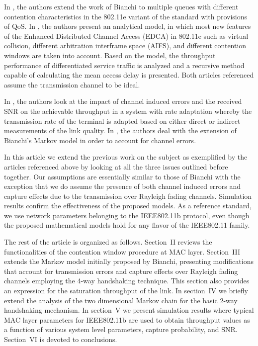 \documentclass[10pt,onecolumn,a4paper]{IEEEtran}
\begin{document}
In \cite{Randhawa}, the authors extend the work of Bianchi to
multiple queues with different contention characteristics in the
802.11e variant of the standard with provisions of QoS. In
\cite{kong}, the authors present an analytical model, in which
most new features of the Enhanced Distributed Channel Access
(EDCA) in 802.11e such as virtual collision, different arbitration
interframe space (AIFS), and different contention windows are taken
into account. Based on the model, the throughput performance of
differentiated service traffic is analyzed and a recursive method
capable of calculating the mean access delay is presented. Both
articles referenced assume the transmission channel to be ideal.

In \cite{Qiao}, the authors look at the impact of channel induced
errors and the received SNR on the achievable throughput in a
system with rate adaptation whereby the transmission rate of the
terminal is adapted based on either direct or indirect
measurements of the link quality. In \cite{Chatzimisios}, the
authors deal with the extension of Bianchi's Markov model in order
to account for channel errors.

In this article we extend the previous work on the subject as
exemplified by the articles referenced above by looking at all the
three issues outlined before together. Our assumptions are
essentially similar to those of Bianchi \cite{Bianchi} with the
exception that we do assume the presence of both channel induced
errors and capture effects due to the transmission over Rayleigh
fading channels. Simulation results confirm the effectiveness of
the proposed models. As a reference standard, we use network
parameters belonging to the IEEE802.11b protocol, even though the
proposed mathematical models hold for any flavor of the IEEE802.11
family.

The rest of the article is organized as follows. Section~II
reviews the functionalities of the contention window procedure at
MAC layer. Section~III extends the Markov model initially proposed
by Bianchi, presenting modifications that account for transmission
errors and capture effects over Rayleigh fading channels employing
the 4-way handshaking technique. This section also provides an
expression for the saturation throughput of the link. In
section~IV we briefly extend the analysis of the two dimensional
Markov chain for the basic 2-way handshaking mechanism. In
section~V we present simulation results where typical MAC layer
parameters for IEEE802.11b are used to obtain throughput values as
a function of various system level parameters, capture
probability, and SNR. Section~VI is devoted to conclusions.
\end{document}
